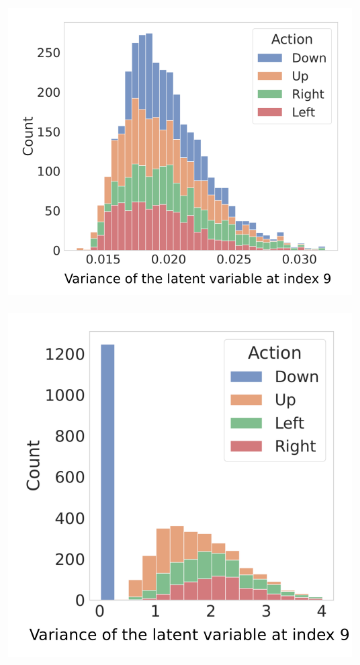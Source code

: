 \documentclass[twoside,11pt]{article}
\begin{document}
\begin{figure}[ht!]
    \centering
    \begin{subfigure}{.47\textwidth}
        \centering
        \includegraphics[draft=false,width=\linewidth]{cka_figures/chmm_109_Transition_variance}
        \caption{}\label{sfig:cka-trans-chmm-sa}
    \end{subfigure}%
    \begin{subfigure}{.4\textwidth}
        \centering
        \includegraphics[draft=false,width=\linewidth]{cka_figures/chmm_113_Transition_variance}
        \caption{}\label{sfig:cka-trans-chmm2-sa}
    \end{subfigure}


\end{figure}
\end{document}
